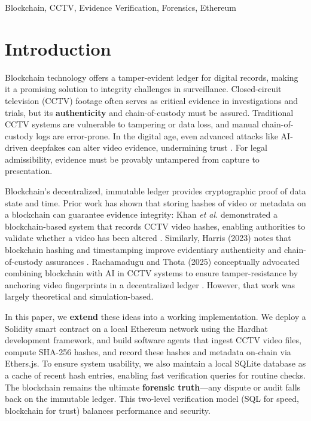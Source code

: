 \documentclass[conference]{IEEEtran}
\begin{document}
\begin{IEEEkeywords}
Blockchain, CCTV, Evidence Verification, Forensics, Ethereum
\end{IEEEkeywords}

\section{Introduction}

Blockchain technology offers a tamper-evident ledger for digital records, making it a promising solution to integrity challenges in surveillance. Closed-circuit television (CCTV) footage often serves as critical evidence in investigations and trials, but its \textbf{authenticity} and chain-of-custody must be assured. Traditional CCTV systems are vulnerable to tampering or data loss, and manual chain-of-custody logs are error-prone. In the digital age, even advanced attacks like AI-driven deepfakes can alter video evidence, undermining trust \cite{b1}. For legal admissibility, evidence must be provably untampered from capture to presentation.

Blockchain's decentralized, immutable ledger provides cryptographic proof of data state and time. Prior work has shown that storing hashes of video or metadata on a blockchain can guarantee evidence integrity: Khan \textit{et al.} demonstrated a blockchain-based system that records CCTV video hashes, enabling authorities to validate whether a video has been altered \cite{b1}. Similarly, Harris (2023) notes that blockchain hashing and timestamping improve evidentiary authenticity and chain-of-custody assurances \cite{b4}. Rachamadugu and Thota (2025) conceptually advocated combining blockchain with AI in CCTV systems to ensure tamper-resistance by anchoring video fingerprints in a decentralized ledger \cite{b5}. However, that work was largely theoretical and simulation-based.

In this paper, we \textbf{extend} these ideas into a working implementation. We deploy a Solidity smart contract on a local Ethereum network using the Hardhat development framework, and build software agents that ingest CCTV video files, compute SHA-256 hashes, and record these hashes and metadata on-chain via Ethers.js. To ensure system usability, we also maintain a local SQLite database as a cache of recent hash entries, enabling fast verification queries for routine checks. The blockchain remains the ultimate \textbf{forensic truth}---any dispute or audit falls back on the immutable ledger. This two-level verification model (SQL for speed, blockchain for trust) balances performance and security.
\end{document}
